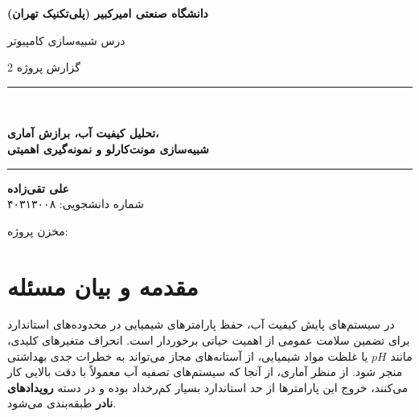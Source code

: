 \documentclass[12pt,a4paper]{article}
\begin{document}
	
\begin{titlepage}
	\centering
	\vspace*{1cm}
	
	{\Large\bfseries دانشگاه صنعتی امیرکبیر (پلی‌تکنیک تهران)\par}
	\vspace{0.4cm}
	{\large درس شبیه‌سازی کامپیوتر\par}
	
	\vspace{2.5cm}
	
	{\large گزارش پروژه 2\par}
	\vspace{1cm}
	\rule{\linewidth}{0.4pt}\\[0.6cm]
	{\LARGE\bfseries تحلیل کیفیت آب، برازش آماری،\\[0.3cm]
		شبیه‌سازی مونت‌کارلو و نمونه‌گیری اهمیتی\par}
	\rule{\linewidth}{0.4pt}
	
	\vspace{2.5cm}
	
	{\large

		\textbf{علی تقی‌زاده}\\[0.2cm]
		شماره دانشجویی: ۴۰۳۱۳۰۰۸\par}
	
	\vfill
	
{\normalsize
	مخزن پروژه:\\[0.2cm]
	\par}

\vspace{1.2cm}


	
\end{titlepage}

	
	
	\setcounter{page}{1}
	
	
	\section{مقدمه و بیان مسئله }
	
	در سیستم‌های پایش کیفیت آب، حفظ پارامترهای شیمیایی در محدوده‌های استاندارد برای تضمین سلامت عمومی از اهمیت حیاتی برخوردار است. انحراف متغیرهای کلیدی، مانند $pH$ یا غلظت مواد شیمیایی، از آستانه‌های مجاز می‌تواند به خطرات جدی بهداشتی منجر شود. از منظر آماری، از آنجا که سیستم‌های تصفیه آب معمولاً با دقت بالایی کار می‌کنند، خروج این پارامترها از حد استاندارد بسیار کم‌رخداد بوده و در دسته \textbf{رویدادهای نادر } طبقه‌بندی می‌شود.
	
\end{document}
